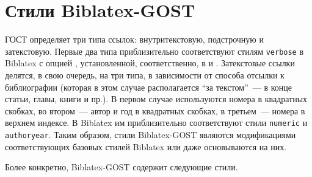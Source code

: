 \documentclass[10pt,a4paper,headings=small,numbers=enddot,english,russian]{ltxdockit}[2011/03/25]
\newcommand*{\biblatex}{Biblatex\xspace}
\newcommand*{\biblatexgost}{Biblatex-GOST\xspace}
\newcommand*{\bibsty}{\texttt}
\begin{document}
\section{Стили \biblatexgost}
\label{sec:styles}

ГОСТ определяет три типа ссылок: внутритекстовую, подстрочную и затекстовую.
Первые два типа приблизительно соответствуют стилям \bibsty{verbose} в \biblatex
с опцией , установленной, соответственно, в  и
. Затекстовые ссылки делятся, в свою очередь, на три типа, в зависимости
от способа отсылки к библиографии (которая в этом случае располагается
\enquote{за текстом}~--- в конце статьи, главы, книги и пр.).
В первом случае используются номера в квадратных скобках, во
втором~--- автор и год в квадратных скобках, в третьем~--- номера в верхнем индексе.
В \biblatex им приблизительно
соответствуют стили \bibsty{numeric} и \bibsty{authoryear}. Таким образом,
стили \biblatexgost являются модификациями соответствующих базовых стилей
\biblatex или даже основываются на них.

Более конкретно, \biblatexgost содержит следующие стили.
\end{document}

